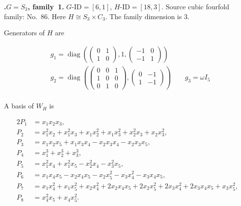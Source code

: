 \documentclass[12pt]{amsart}
\numberwithin{equation}{section}
\theoremstyle{plain}
\theoremstyle{definition}
\theoremstyle{remark}
\DeclareMathOperator{\diag}{diag}
\newenvironment{familydisplay}{%
  \begingroup
  \setlength{\arraycolsep}{1.35pt}%
  \renewcommand{\arraystretch}{0.96}%
  \setlength{\jot}{2pt}%
}{\endgroup}
\newcommand{\smat}[1]{\left(\begin{smallmatrix}#1\end{smallmatrix}\right)}
\begin{document}
\par{}\medskip\noindent\textbf{.\enspace $G=S_3$, family~1.}\label{fam:threefold-no-19}
$G\text{-ID}=[6,1]$, $H\text{-ID}=[18,3]$.
Source cubic fourfold family: No.~86.  Here
$H\cong S_3\times C_3$.
The family dimension is $3$.
\par\smallskip\noindent Generators of $H$ are\par\nopagebreak
\begin{familydisplay}
\begin{align*}
&g_{1}=\diag\!\left(\smat{0&1\\1&0},1,\smat{-1&0\\-1&1}\right)\\
&g_{2}=\diag\!\left(\smat{0&0&1\\1&0&0\\0&1&0},
\smat{0&-1\\1&-1}\right)\qquad g_{3}=\omega I_5\\
\end{align*}
\end{familydisplay}
\par\smallskip\noindent A basis of $W_H$ is\par\nopagebreak
\begin{familydisplay}
\begin{alignat*}{2}
P_{1}&=x_{1}x_{2}x_{3},\\[2pt]
P_{2}&=x_{1}^{2}x_{2}+x_{1}^{2}x_{3}+x_{1}x_{2}^{2}+x_{1}x_{3}^{2}+x_{2}^{2}x_{3}+x_{2}x_{3}^{2},\\[2pt]
P_{3}&=x_{1}x_{2}x_{5}+x_{1}x_{3}x_{4}-x_{2}x_{3}x_{4}-x_{2}x_{3}x_{5},\\[2pt]
P_{4}&=x_{1}^{3}+x_{2}^{3}+x_{3}^{3},\\[2pt]
P_{5}&=x_{1}^{2}x_{4}+x_{1}^{2}x_{5}-x_{2}^{2}x_{4}-x_{3}^{2}x_{5},\\[2pt]
P_{6}&=x_{1}x_{4}x_{5}-x_{2}x_{4}x_{5}-x_{2}x_{5}^{2}-x_{3}x_{4}^{2}-x_{3}x_{4}x_{5},\\[2pt]
P_{7}&=x_{1}x_{4}^{2}+x_{1}x_{5}^{2}+x_{2}x_{4}^{2}+2x_{2}x_{4}x_{5}+2x_{2}x_{5}^{2}+2x_{3}x_{4}^{2}+2x_{3}x_{4}x_{5}+x_{3}x_{5}^{2},\\[2pt]
P_{8}&=x_{4}^{2}x_{5}+x_{4}x_{5}^{2}.\\[2pt]
\end{alignat*}
\end{familydisplay}
\end{document}

